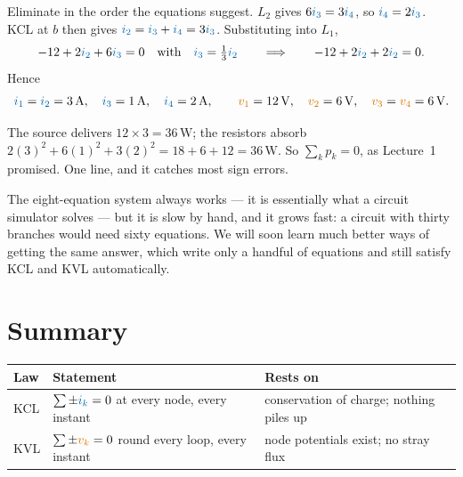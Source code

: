 \documentclass[11pt,a4paper]{article}
\newcommand{\Icol}[1]{\textcolor{ccur}{#1}}
\newcommand{\Vcol}[1]{\textcolor{cvolt}{#1}}
\newcommand{\Pcol}[1]{\textcolor{cpow}{#1}}
\newcommand{\uni}[1]{\,\mathrm{#1}}
\newcommand{\A}{\uni{A}}   \newcommand{\V}{\uni{V}}
\newcommand{\W}{\uni{W}}   \newcommand{\J}{\uni{J}}
\begin{document}
Eliminate in the order the equations suggest. $L_2$ gives $6\Icol{i_3} = 3\Icol{i_4}$, so
$\Icol{i_4} = 2\Icol{i_3}$. KCL at $b$ then gives $\Icol{i_2} = \Icol{i_3} + \Icol{i_4}
= 3\Icol{i_3}$. Substituting into $L_1$,
\[
  -12 + 2\Icol{i_2} + 6\Icol{i_3} = 0
  \quad\text{with}\quad \Icol{i_3} = \tfrac13\Icol{i_2}
  \qquad\Longrightarrow\qquad
  -12 + 2\Icol{i_2} + 2\Icol{i_2} = 0 .
\]
Hence
\[
  \Icol{i_1} = \Icol{i_2} = 3\A, \quad \Icol{i_3} = 1\A, \quad \Icol{i_4} = 2\A,
  \qquad
  \Vcol{v_1} = 12\V, \quad \Vcol{v_2} = 6\V, \quad \Vcol{v_3} = \Vcol{v_4} = 6\V .
\]

\begin{ideabox}
The source delivers $12 \times 3 = 36\W$; the resistors absorb
$2(3)^2 + 6(1)^2 + 3(2)^2 = 18 + 6 + 12 = 36\W$. So \Pcol{$\sum_k p_k = 0$}, as Lecture~1
promised. One line, and it catches most sign errors.
\end{ideabox}

The eight-equation system always works --- it is essentially what a circuit simulator
solves --- but it is slow by hand, and it grows fast: a circuit with thirty branches would
need sixty equations. We will soon learn much better ways of getting the same answer,
which write only a handful of equations and still satisfy KCL and KVL automatically.

\section*{Summary}

\begin{center}
\small
\begin{tabular}{@{}l l l@{}}
\toprule
\textbf{Law} & \textbf{Statement} & \textbf{Rests on}\\
\midrule
KCL & $\sum \pm \Icol{i_k} = 0$ at every node, every instant
    & conservation of charge; nothing piles up\\
KVL & $\sum \pm \Vcol{v_k} = 0$ round every loop, every instant
    & node potentials exist; no stray flux\\
\bottomrule
\end{tabular}
\end{center}
\end{document}
